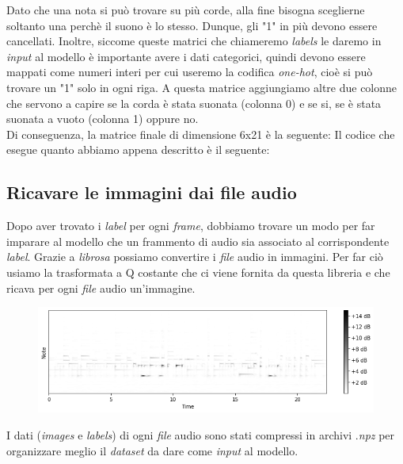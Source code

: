 \vspace*{2ex}
Dato che una nota si può trovare su più corde, alla fine bisogna sceglierne soltanto una perchè il suono è lo stesso. Dunque, gli "1" in più devono essere cancellati. Inoltre, siccome queste matrici che chiameremo \textit{labels} le daremo in \textit{input} al modello è importante avere i dati categorici, quindi devono essere mappati come numeri interi per cui useremo la codifica \textit{one-hot}, cioè si può trovare un "1" solo in ogni riga. A questa matrice aggiungiamo altre due colonne che servono a capire se la corda è stata suonata (colonna 0) e se si, se è stata suonata a vuoto (colonna 1) oppure no.\\
\newline
Di conseguenza, la matrice finale di dimensione 6x21 è la seguente:
\vspace*{2ex}
\vspace*{2ex}
Il codice che esegue quanto abbiamo appena descritto è il seguente:
\vspace*{2ex}
\subsection{Ricavare le immagini dai file audio}
Dopo aver trovato i \textit{label} per ogni \textit{frame}, dobbiamo trovare un modo per far imparare al modello che un frammento di audio sia associato al corrispondente \textit{label}.
Grazie a \textit{librosa} possiamo convertire i \textit{file} audio in immagini. Per far ciò usiamo la trasformata a Q costante che ci viene fornita da questa libreria e che ricava per ogni \textit{file} audio un'immagine.
\begin{figure}[H]
	\centering
	\includegraphics[scale=0.60]{./images/img7.png}
\end{figure}
\vspace*{2ex}
\vspace*{2ex}
I dati (\textit{images} e \textit{labels}) di ogni \textit{file} audio sono stati compressi in archivi .\textit{npz} per organizzare meglio il \textit{dataset} da dare come \textit{input} al modello.
